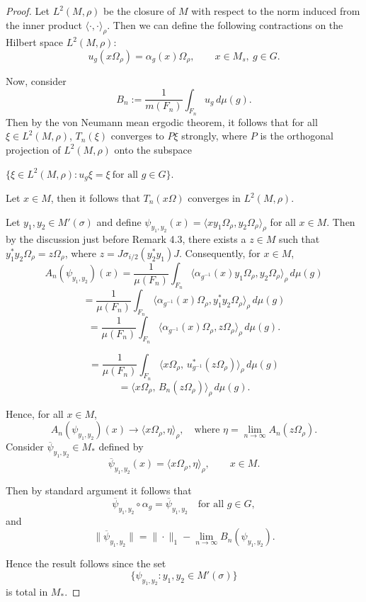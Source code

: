 \documentclass[11pt]{amsart}
\theoremstyle{definition}
\theoremstyle{myremark}
\numberwithin{equation}{section}
\begin{document}
            \begin{proof}
Let $L^{2}(M,\rho)$ be the closure of $M$ with respect to the norm induced from the
inner product $\langle \cdot , \cdot \rangle_{\rho}$. Then we can define the following contractions on the Hilbert space
$L^{2}(M,\rho)$:
\[
u_{g}(x\Omega_{\rho})=\alpha_{g}(x)\Omega_{\rho}, \qquad x\in M_{s},\ g\in G.
\]

Now, consider
\[
B_{n}:=\frac{1}{m(F_{n})}\int_{F_{n}}u_g\, d\mu(g).
\]
Then by the von Neumann mean ergodic theorem, it follows that for all $\xi\in L^{2}(M,\rho)$, $T_{n}(\xi)$ converges
to $P\xi$ strongly, where $P$ is the orthogonal projection of $L^{2}(M,\rho)$ onto the subspace
\begin{center}
$\{\xi\in L^{2}(M,\rho):u_{g}\xi=\xi\ \text{for all }g\in G\}$.
\end{center}
Let $x\in M$, then it follows that $T_{n}(x\Omega)$ converges in $L^{2}(M,\rho)$.

\noindent Let $y_{1},y_{2}\in M'(\sigma)$ and define $\psi_{y_{1},y_{2}}(x)=\langle xy_{1}\Omega_{\rho},y_{2}\Omega_{\rho}\rangle_{\rho}$
for all $x\in M$. Then by the discussion just before Remark 4.3, there exists a $z\in M$ such that
$y_{1}^{*}y_{2}\Omega_{\rho}=z\Omega_{\rho}$, where $z=J\sigma_{i/2}(y_{2}^{*}y_{1})J$.
Consequently, for $x\in M$,
\[
A_{n}(\psi_{y_{1},y_{2}})(x)
    =\frac{1}{\mu(F_{n})}\int_{F_{n}}
      \langle \alpha_{g^{-1}}(x)y_{1}\Omega_{\rho},y_{2}\Omega_{\rho}\rangle_{\rho}\, d\mu(g)
\]
\[
    =\frac{1}{\mu(F_{n})}\int_{F_{n}}
      \langle \alpha_{g^{-1}}(x)\Omega_{\rho},y_{1}^{*}y_{2}\Omega_{\rho}\rangle_{\rho}\, d\mu(g)
\]
\[
    =\frac{1}{\mu(F_{n})}\int_{F_{n}}
      \langle \alpha_{g^{-1}}(x)\Omega_{\rho},z\Omega_{\rho}\rangle_{\rho}\, d\mu(g).
\]

\[
= \frac{1}{\mu(F_{n})} \int_{F_{n}} \langle x\Omega_{\rho},\, u_{g^{-1}}^{*}(z\Omega_{\rho}) \rangle_{\rho}\, d\mu(g)
\]
\[
= \langle x\Omega_{\rho},\, B_{n}(z\Omega_{\rho}) \rangle_{\rho}\, d\mu(g).
\]

Hence, for all $x\in M$, 
\[
A_{n}(\psi_{y_{1},y_{2}})(x) \to \langle x\Omega_{\rho}, \eta \rangle_{\rho},
\quad\text{where }\eta = \lim_{n\to\infty} A_{n}(z\Omega_{\rho}).
\]
Consider $\overline{\psi}_{y_{1},y_{2}} \in M_{*}$ defined by
\[
\overline{\psi}_{y_{1},y_{2}}(x) = \langle x\Omega_{\rho}, \eta \rangle_{\rho}, \qquad x\in M.
\]

Then by standard argument it follows that 
\[
\overline{\psi}_{y_{1},y_{2}} \circ \alpha_{g} = \overline{\psi}_{y_{1},y_{2}}
\quad\text{for all } g\in G,
\]
and
\[
\|\overline{\psi}_{y_{1},y_{2}}\| = \|\cdot\|_{1}
    - \lim_{n\to\infty} B_{n}(\psi_{y_{1},y_{2}}).
\]

Hence the result follows since the set 
\[
\{\psi_{y_{1},y_{2}} : y_{1},y_{2}\in M'(\sigma)\}
\]
is total in $M_{*}$.



        \end{proof}
        
\end{document}
